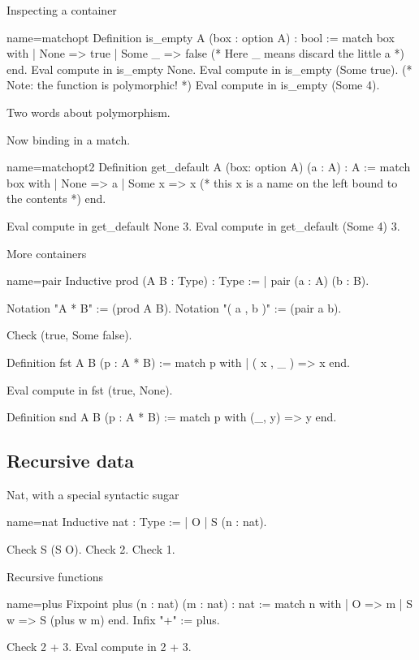Inspecting a container

\begin{coq}{name=matchopt}{}
Definition is_empty A (box : option A) : bool :=
  match box with
  | None => true
  | Some _ => false  (* Here _ means discard the little a *)
  end.
Eval compute in is_empty None.
Eval compute in is_empty (Some true).
(* Note: the function is polymorphic! *)
Eval compute in is_empty (Some 4).
\end{coq}

Two words about polymorphism.

Now binding in a match.

\begin{coq}{name=matchopt2}{}
Definition get_default A (box: option A) (a : A) : A :=
  match box with
  | None => a
  | Some x => x  (* this x is a name on the left bound to the contents *)
  end.

Eval compute in get_default None 3.
Eval compute in get_default (Some 4) 3.
\end{coq}

More containers

\begin{coq}{name=pair}{}
 Inductive prod (A B : Type) : Type :=
 | pair (a : A) (b : B).

 Notation "A * B" := (prod A B).
 Notation "( a , b )" := (pair a b).

Check (true, Some false).

Definition fst A B (p : A * B) :=
  match p with
  | ( x , _ ) => x
  end.

Eval compute in fst (true, None).

Definition snd A B (p : A * B) :=
  match p with (_, y) => y end.
\end{coq}

\subsection{Recursive data}

Nat, with a special syntactic sugar

\begin{coq}{name=nat}{}
   Inductive nat : Type :=
   | O
   | S (n : nat).

Check S (S O).
Check 2.
Check 1.
\end{coq}

Recursive functions

\begin{coq}{name=plus}{}
Fixpoint plus (n : nat) (m : nat) : nat :=
  match n with
  | O => m
  | S w => S (plus w m)
  end.
Infix "+" := plus.

Check 2 + 3.
Eval compute in 2 + 3.
\end{coq}

